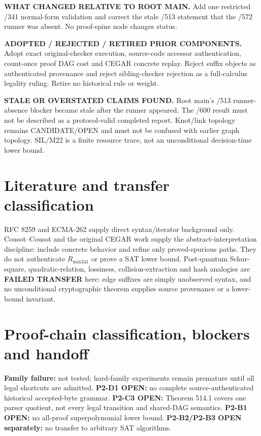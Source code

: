 \documentclass[11pt]{article}
\newcommand{\Rmix}{R_{\mathrm{mix341}}}
\begin{document}
\textbf{WHAT CHANGED RELATIVE TO ROOT MAIN.}  Add one restricted /341 normal-form validation and correct
the stale /513 statement that the /572 runner was absent.  No proof-spine node changes status.

\textbf{ADOPTED / REJECTED / RETIRED PRIOR COMPONENTS.}  Adopt exact original-checker execution,
source-code accessor authentication, count-once proof DAG cost and CEGAR concrete replay.  Reject suffix
objects as authenticated provenance and reject sibling-checker rejection as a full-calculus legality
ruling.  Retire no historical rule or weight.

\textbf{STALE OR OVERSTATED CLAIMS FOUND.}  Root main's /513 runner-absence blocker became stale after
the runner appeared.  The /600 result must not be described as a protocol-valid completed report.
Knot/link topology remains CANDIDATE/OPEN and must not be confused with earlier graph topology.  SIL/M22
is a finite resource trace, not an unconditional decision-time lower bound.

\section*{Literature and transfer classification}

RFC 8259 and ECMA-262 supply direct syntax/iterator background only.  Cousot--Cousot and the original
CEGAR work supply the abstract-interpretation discipline: include concrete behavior and refine only
proved-spurious paths.  They do not authenticate \(\Rmix\) or prove a SAT lower bound.  Post-quantum
Schur-square, quadratic-relation, lossiness, collision-extraction and hash analogies are
\textbf{FAILED TRANSFER} here: edge suffixes are simply unobserved syntax, and no unconditional
cryptographic theorem supplies source provenance or a lower-bound invariant.

\section*{Proof-chain classification, blockers and handoff}

\textbf{Family failure:} not tested; hard-family experiments remain premature until all legal shortcuts
are admitted.  \textbf{P2-D1 OPEN:} no complete source-authenticated historical accepted-byte grammar.
\textbf{P2-C3 OPEN:} Theorem 514.1 covers one parser quotient, not every legal transition and shared-DAG
semantics.  \textbf{P2-B1 OPEN:} no all-proof superpolynomial lower bound.  \textbf{P2-B2/P2-B3 OPEN
separately:} no transfer to arbitrary SAT algorithms.
\end{document}
